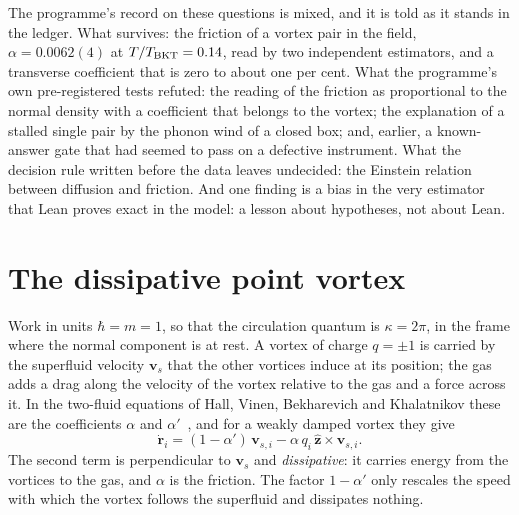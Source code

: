 The programme's record on these questions is mixed, and it is told as it stands in the ledger. What survives: the friction of a vortex pair in the field, $\alpha=0.0062(4)$ at
$T/T_{\rm BKT}=0.14$, read by two independent estimators, and a transverse coefficient that is zero to about one per cent. What the programme's own pre-registered tests refuted: the reading of
the friction as proportional to the normal density with a coefficient that belongs to the vortex; the explanation of a stalled single pair by the phonon wind of a closed box; and, earlier, a
known-answer gate that had seemed to pass on a defective instrument. What the decision rule written before the data leaves undecided: the Einstein relation between diffusion and friction.
And one finding is a bias in the very estimator that Lean proves exact in the model: a lesson about hypotheses, not about Lean.

\section{The dissipative point vortex}\label{ch07:model}

Work in units $\hbar=m=1$, so that the circulation quantum is $\kappa=2\pi$, in the frame where the normal component is at rest. A vortex of charge $q=\pm1$ is carried by the superfluid
velocity $\mathbf v_s$ that the other vortices induce at its position; the gas adds a drag along the velocity of the vortex relative to the gas and a force across it. In the two-fluid
equations of Hall, Vinen, Bekharevich and Khalatnikov these are the coefficients $\alpha$ and $\alpha'$~\cite{Shukla2014}, and for a weakly damped vortex they give
\begin{equation}
  \dot{\mathbf r}_i=(1-\alpha')\,\mathbf v_{s,i}-\alpha\,q_i\,\hat{\mathbf z}\times\mathbf v_{s,i}.
  \label{ch07:eq-motion}
\end{equation}
The second term is perpendicular to $\mathbf v_s$ and \emph{dissipative}: it carries energy from the vortices to the gas, and $\alpha$ is the friction. The factor $1-\alpha'$ only rescales the speed with which the
vortex follows the superfluid and dissipates nothing.

